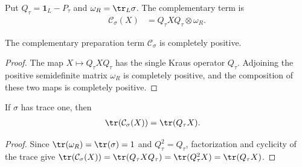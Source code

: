 \begin{definition}
    \label{def:partial_trace_petz_complement}
    \leanok
    Put $Q_\tau=\mathbf 1_L-P_\tau$ and
    $\omega_R=\tr_L\sigma$. The complementary term is
    \begin{align}
        \mathcal C_\sigma(X)
        &=Q_\tau XQ_\tau\otimes\omega_R.
        \label{eq:entropy_petz_complement}
    \end{align}
\end{definition}

\begin{theorem}
    \label{thm:partial_trace_petz_complement_cp}
    \leanok
    The complementary preparation term $\mathcal C_\sigma$ is completely
    positive.
\end{theorem}

\begin{proof}\leanok
    The map $X\mapsto Q_\tau XQ_\tau$ has the single Kraus operator $Q_\tau$.
    Adjoining the positive semidefinite matrix $\omega_R$ is completely
    positive, and the composition of these two maps is completely positive.
\end{proof}

\begin{lemma}
    \label{lem:partial_trace_petz_complement_trace}
    \leanok
    If $\sigma$ has trace one, then
    \begin{align}
        \tr(\mathcal C_\sigma(X))
        &=\tr(Q_\tau X).
        \label{eq:entropy_petz_complement_trace}
    \end{align}
\end{lemma}

\begin{proof}\leanok
    Since $\tr(\omega_R)=\tr(\sigma)=1$ and
    $Q_\tau^2=Q_\tau$, factorization and cyclicity of the trace give
    $\tr(\mathcal C_\sigma(X))
      =\tr(Q_\tau XQ_\tau)
      =\tr(Q_\tau^2X)
      =\tr(Q_\tau X)$.
\end{proof}

